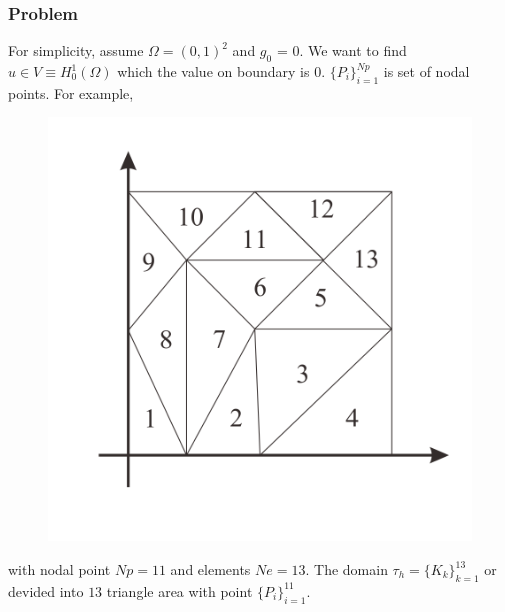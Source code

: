 \documentclass[a4paper,10pt]{article}
\begin{document}
\subsubsection{Problem}
For simplicity, assume $ \Omega = (0,1)^2 $ and $ g_{0} $ = 0. We want to find $ u \in V \equiv H_{0}^{1}(\Omega) $ which the value on boundary is $ 0 $. $ \{ P_{i} \}_{i=1}^{Np} $ is set of nodal points. For example,

\begin{figure}[h!]
	\centering
	\includegraphics[width=0.5\linewidth]{picture/problem}
	\caption{}
	\label{fig:problem}
\end{figure}
with nodal point $ Np =11 $ and elements $ Ne =13 $.  The domain $ \tau_{h}= \{K_{k}\}_{k=1}^{13} $ or devided into $ 13 $ triangle area with point $ \{P_{i}\}_{i=1}^{11} $. %
\end{document}
